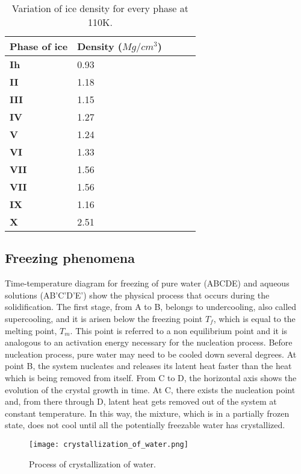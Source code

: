 \begin{table}[h!]
	\begin{tabular}{@{}lllll@{}}
		\toprule[1pt]
		\textbf{Phase of ice} & \textbf{Density ($Mg/cm^{3}$)} \\ \midrule[2pt]
		\textbf{Ih} &  0.93 \\
		\textbf{II} &  1.18 \\
		\textbf{III} & 1.15  \\
		\textbf{IV} & 1.27  \\
		\textbf{V} &  1.24 \\
		\textbf{VI} & 1.33  \\
		\textbf{VII} & 1.56	\\
		\textbf{VII} & 1.56	\\
		\textbf{IX} & 1.16  \\
		\textbf{X} &  2.51 \\  \bottomrule[1pt]		
	\end{tabular}
	\centering
	\caption{Variation of ice density for every phase at 110K.}	
	\label{fig:transportEq.}
\end{table}
\subsection{Freezing phenomena}
Time-temperature diagram for freezing of pure water (ABCDE) and aqueous solutions (AB'C'D'E') show the physical process that occurs during the solidification. The first stage, from A to B, belongs to undercooling, also called supercooling, and it is arisen below the freezing point $T_f$, which is equal to the melting point, $T_m$. This point is referred to a non equilibrium point and it is analogous to an activation energy necessary for the nucleation process. Before nucleation process, pure water may need to be cooled down several degrees. At point B, the system nucleates and releases its latent heat faster than the heat which is being removed from itself.
\newline
From C to D, the horizontal axis shows the evolution of the crystal growth in time. At C, there exists the nucleation point and, from there through D, latent heat gets removed out of the system at constant temperature. In this way, the mixture, which is in a partially frozen state, does not cool until all the potentially freezable water has crystallized.


\begin{figure}[h]
	\label{1.2}	\centering	
	\texttt{[image: crystallization\_of\_water.png]}
	\caption{Process of crystallization of water.}
\end{figure} 



